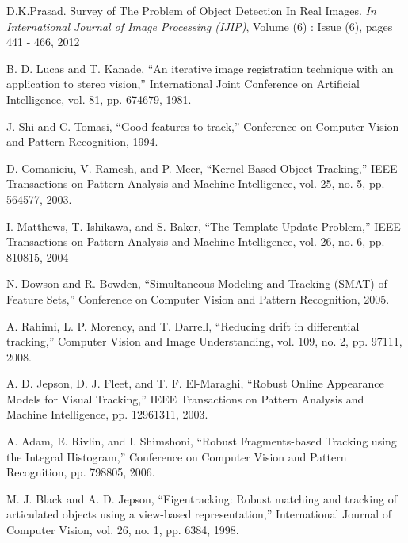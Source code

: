 \begin{thebibliography}{SMAT}
D.K.Prasad. Survey of The Problem of Object Detection In Real Images. \textit{In International Journal of Image Processing (IJIP)}, Volume (6) : Issue (6), pages 441 - 466, 2012

 B. D. Lucas and T. Kanade, \textquotedblleft{}An
iterative image registration technique with an application to stereo vision,\textquotedblright{} International Joint Conference on Artificial Intelligence, vol. 81, pp. 674\textendash{}679, 1981.

 J. Shi and C. Tomasi, \textquotedblleft{}Good features to track,\textquotedblright{} Conference on Computer Vision and Pattern Recognition, 1994.

D. Comaniciu, V. Ramesh, and P. Meer, \textquotedblleft{}Kernel-Based Object Tracking,\textquotedblright{} IEEE Transactions on Pattern Analysis and Machine Intelligence, vol. 25, no. 5, pp. 564\textendash{}577, 2003.

I. Matthews, T. Ishikawa, and S. Baker, \textquotedblleft{}The Template Update Problem,\textquotedblright{} IEEE Transactions on Pattern Analysis and Machine Intelligence, vol. 26, no. 6, pp. 810\textendash{}815, 2004

N. Dowson and R. Bowden, \textquotedblleft{}Simultaneous Modeling and Tracking (SMAT) of Feature Sets,\textquotedblright{} Conference on Computer Vision and Pattern Recognition, 2005.

A. Rahimi, L. P. Morency, and T. Darrell, \textquotedblleft{}Reducing drift in differential tracking,\textquotedblright{} Computer Vision and Image Understanding, vol. 109, no. 2, pp. 97\textendash{}111, 2008.

A. D. Jepson, D. J. Fleet, and T. F. El-Maraghi, \textquotedblleft{}Robust Online Appearance Models for Visual Tracking,\textquotedblright{} IEEE Transactions on Pattern Analysis and Machine Intelligence, pp. 1296\textendash{}1311, 2003.

A. Adam, E. Rivlin, and I. Shimshoni, \textquotedblleft{}Robust Fragments-based Tracking using the Integral Histogram,\textquotedblright{} Conference on Computer Vision and Pattern Recognition, pp. 798\textendash{}805, 2006.

M. J. Black and A. D. Jepson, \textquotedblleft{}Eigentracking: Robust matching and tracking of articulated objects using a view-based representation,\textquotedblright{} International Journal of Computer Vision, vol. 26, no. 1, pp. 63\textendash{}84, 1998.


\end{thebibliography}
